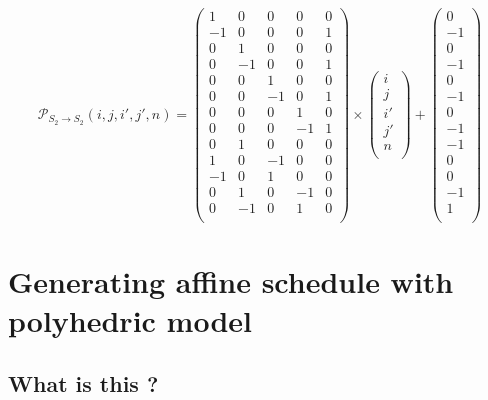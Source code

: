 \begin{itemize}
	$$\mathcal{P}_{S_{2} \rightarrow S_{2}}(i, j, i', j', n) = 
	\begin{pmatrix}
		1  & 0  & 0  & 0  & 0  \\
		-1 & 0  & 0  & 0  & 1  \\
		0  & 1  & 0  & 0  & 0  \\
		0  & -1 & 0  & 0  & 1  \\
		0  & 0  & 1  & 0  & 0  \\
		0  & 0  & -1 & 0  & 1  \\
		0  & 0  & 0  & 1  & 0  \\
		0  & 0  & 0  & -1 & 1  \\
		0  & 1  & 0  & 0  & 0  \\
		1  & 0  & -1 & 0  & 0  \\
		-1 & 0  & 1  & 0  & 0  \\
		0  & 1  & 0  & -1 & 0  \\
		0  & -1 & 0  & 1  & 0  \\
	\end{pmatrix}
	\times
	\begin{pmatrix}
		i  \\
		j  \\
		i' \\
		j' \\
		n  \\
	\end{pmatrix}
	+
	\begin{pmatrix}
		0  \\
		-1 \\
		0  \\
		-1 \\
		0  \\
		-1 \\
		0  \\
		-1 \\
		-1 \\
		0  \\
		0  \\
		-1 \\
		1  \\
	\end{pmatrix}$$
\end{itemize}


	\section{Generating affine schedule with polyhedric model}
	\label{polyhedric:schedule}

		\subsection{What is this ?}

